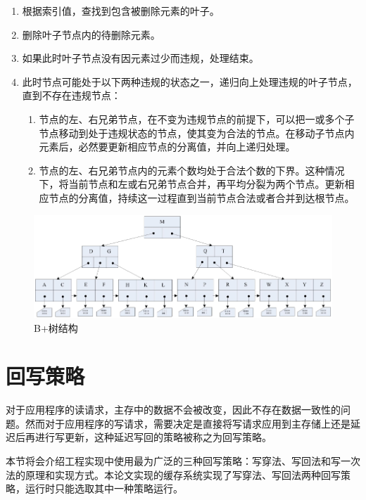 \begin{itemize}
\begin{enumerate}
\item 根据索引值，查找到包含被删除元素的叶子。
\item 删除叶子节点内的待删除元素。
\item 如果此时叶子节点没有因元素过少而违规，处理结束。
\item 此时节点可能处于以下两种违规的状态之一，递归向上处理违规的叶子节点，直到不存在违规节点：
\begin{enumerate}
\item 节点的左、右兄弟节点，在不变为违规节点的前提下，可以把一或多个子节点移动到处于违规状态的节点，使其变为合法的节点。在移动子节点内元素后，必然要更新相应节点的分离值，并向上递归处理。
\item 节点的左、右兄弟节点内的元素个数均处于合法个数的下界。这种情况下，将当前节点和左或右兄弟节点合并，再平均分裂为两个节点。更新相应节点的分离值，持续这一过程直到当前节点合法或者合并到达根节点。
\end{enumerate}
\end{enumerate}

\end{itemize}

\begin{figure}[H]
\centering
\includegraphics[width=1\linewidth]{./graph/bplus-tree}
\caption{B+树结构}
\label{fig:bplus-tree}
\end{figure}

\section{回写策略}
\label{sec:wb_strategy}

对于应用程序的读请求，主存中的数据不会被改变，因此不存在数据一致性的问题。然而对于应用程序的写请求，需要决定是直接将写请求应用到主存储上还是延迟后再进行写更新，这种延迟写回的策略被称之为回写策略\cite{writeback2014}。

本节将会介绍工程实现中使用最为广泛的三种回写策略：写穿法、写回法和写一次法的原理和实现方式。本论文实现的缓存系统实现了写穿法、写回法两种回写策略，运行时只能选取其中一种策略运行。

